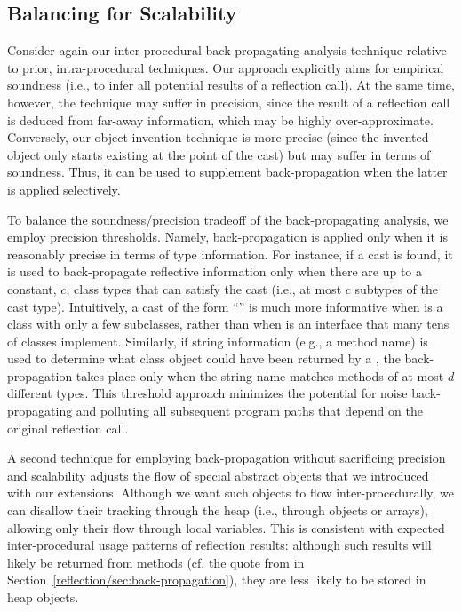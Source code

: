 \subsection{Balancing for Scalability}
\label{reflection/sec:throttling}

Consider again our inter-procedural back-propagating analysis
technique relative to prior, intra-procedural techniques. Our approach
explicitly aims for empirical soundness (i.e., to infer all potential
results of a reflection call). At the same time, however, the
technique may suffer in precision, since the result of a reflection
call is deduced from far-away information, which may be highly
over-approximate. Conversely, our object invention technique is more
precise (since the invented object only starts existing at the point
of the cast) but may suffer in terms of soundness. Thus, it can be
used to supplement back-propagation when the latter is applied
selectively.

To balance the soundness/precision tradeoff of the back-propagating
analysis, we employ precision thresholds. Namely, back-propagation is
applied only when it is reasonably precise in terms of type
information. For instance, if a cast is found, it is used to
back-propagate reflective information only when there are up to a
constant, $c$, class types that can satisfy the cast (i.e., at most
$c$ subtypes of the cast type). Intuitively, a cast of the form
``'' is much more informative when  is a
class with only a few subclasses, rather than when  is an
interface that many tens of classes implement. Similarly, if string
information (e.g., a method name) is used to determine what class
object could have been returned by a ,
the back-propagation takes place only when the string name matches
methods of at most $d$ different types. This threshold approach
minimizes the potential for noise back-propagating and polluting all
subsequent program paths that depend on the original reflection call.

A second technique for employing back-propagation without sacrificing
precision and scalability adjusts the flow of special abstract objects
that we introduced with our extensions.  Although we want such objects
to flow inter-procedurally, we can disallow their tracking through the
heap (i.e., through objects or arrays), allowing only their flow
through local variables. This is consistent with expected
inter-procedural usage patterns of reflection results: although such
results will likely be returned from methods (cf. the quote from
\cite{aplas/LivshitsWL05} in
Section~\ref{reflection/sec:back-propagation}), they are less likely
to be stored in heap objects.

